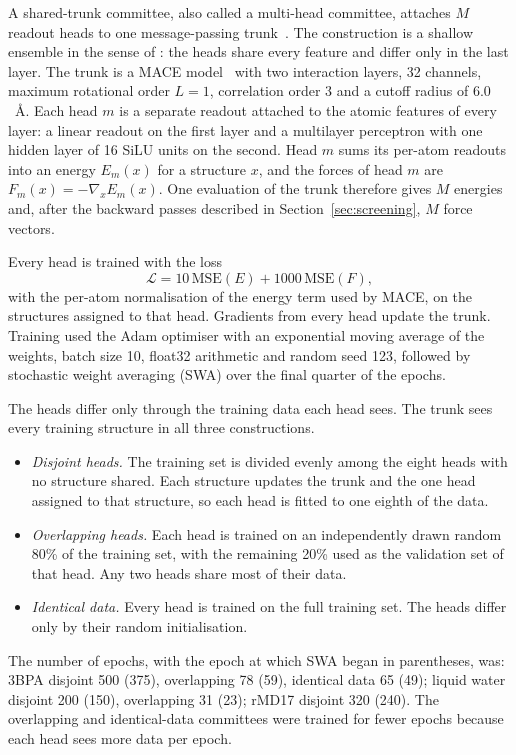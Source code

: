 A shared-trunk committee, also called a multi-head committee, attaches $M$
readout heads to one message-passing trunk~\citep{beck2025committee}. The
construction is a shallow ensemble in the sense of
\citet{kellner2024shallow}: the heads share every feature and differ only in
the last layer. The trunk is a MACE model~\citep{batatia2022mace} with two
interaction layers, 32 channels, maximum rotational order $L=1$, correlation
order 3 and a cutoff radius of $6.0$~\AA. Each head $m$ is a separate readout
attached to the atomic features of every layer: a linear readout on the first
layer and a multilayer perceptron with one hidden layer of 16 SiLU units on the
second. Head $m$ sums its per-atom readouts into an energy $E_m(x)$ for a
structure $x$, and the forces of head $m$ are
$F_m(x)=-\nabla_x E_m(x)$. One evaluation of the trunk therefore gives $M$
energies and, after the backward passes described in
Section~\ref{sec:screening}, $M$ force vectors.

Every head is trained with the loss
\begin{equation}
\mathcal{L}=10\,\mathrm{MSE}(E)+1000\,\mathrm{MSE}(F),
\label{eq:loss}
\end{equation}
with the per-atom normalisation of the energy term used by MACE, on the
structures assigned to that head. Gradients from every head update the trunk.
Training used the Adam optimiser with an exponential moving average of the
weights, batch size 10, float32 arithmetic and random seed 123, followed by
stochastic weight averaging (SWA) over the final quarter of the epochs.

The heads differ only through the training data each head sees. The trunk
sees every training structure in all three constructions.
\begin{itemize}
\item \emph{Disjoint heads.} The training set is divided evenly among the
  eight heads with no structure shared. Each structure updates the trunk and
  the one head assigned to that structure, so each head is fitted to one
  eighth of the data.
\item \emph{Overlapping heads.} Each head is trained on an independently drawn
  random 80\% of the training set, with the remaining 20\% used as the
  validation set of that head. Any two heads share most of their data.
\item \emph{Identical data.} Every head is trained on the full training set.
  The heads differ only by their random initialisation.
\end{itemize}
The number of epochs, with the epoch at which SWA began in parentheses, was:
3BPA disjoint 500 (375), overlapping 78 (59), identical data 65 (49); liquid
water disjoint 200 (150), overlapping 31 (23); rMD17 disjoint 320 (240). The
overlapping and identical-data committees were trained for fewer epochs because
each head sees more data per epoch.

